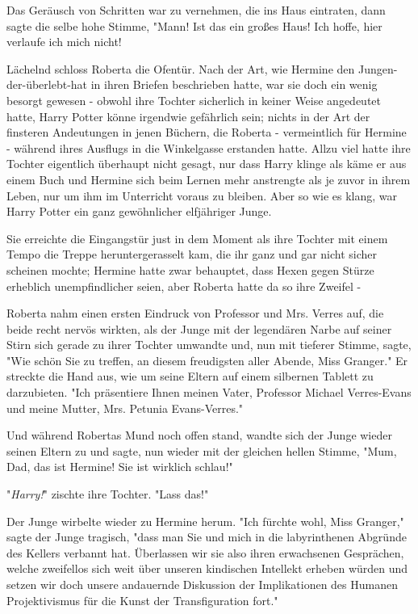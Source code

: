 {Das Geräusch von Schritten war zu vernehmen, die ins Haus eintraten, dann sagte die selbe hohe Stimme, "Mann! Ist das ein großes Haus! Ich hoffe, hier verlaufe ich mich nicht!

Lächelnd schloss Roberta die Ofentür. Nach der Art, wie Hermine den Jungen-der-überlebt-hat in ihren Briefen beschrieben hatte, war sie doch ein wenig besorgt gewesen - obwohl ihre Tochter sicherlich in keiner Weise angedeutet hatte, Harry Potter könne irgendwie gefährlich sein; nichts in der Art der finsteren Andeutungen in jenen Büchern, die Roberta - vermeintlich für Hermine - während ihres Ausflugs in die Winkelgasse erstanden hatte. Allzu viel hatte ihre Tochter eigentlich überhaupt nicht gesagt, nur dass Harry klinge als käme er aus einem Buch und Hermine sich beim Lernen mehr anstrengte als je zuvor in ihrem Leben, nur um ihm im Unterricht voraus zu bleiben. Aber so wie es klang, war Harry Potter ein ganz gewöhnlicher elfjähriger Junge.

Sie erreichte die Eingangstür just in dem Moment als ihre Tochter mit einem Tempo die Treppe heruntergerasselt kam, die ihr ganz und gar nicht sicher scheinen mochte; Hermine hatte zwar behauptet, dass Hexen gegen Stürze erheblich unempfindlicher seien, aber Roberta hatte da so ihre Zweifel -

Roberta nahm einen ersten Eindruck von Professor und Mrs. Verres auf, die beide recht nervös wirkten, als der Junge mit der legendären Narbe auf seiner Stirn sich gerade zu ihrer Tochter umwandte und, nun mit tieferer Stimme, sagte, "Wie schön Sie zu treffen, an diesem freudigsten aller Abende, Miss Granger." Er streckte die Hand aus, wie um seine Eltern auf einem silbernen Tablett zu darzubieten. "Ich präsentiere Ihnen meinen Vater, Professor Michael Verres-Evans und meine Mutter, Mrs. Petunia Evans-Verres."

Und während Robertas Mund noch offen stand, wandte sich der Junge wieder seinen Eltern zu und sagte, nun wieder mit der gleichen hellen Stimme, "Mum, Dad, das ist Hermine! Sie ist wirklich schlau!"

"\emph{Harry!}" zischte ihre Tochter. "Lass das!"

Der Junge wirbelte wieder zu Hermine herum. "Ich fürchte wohl, Miss Granger," sagte der Junge tragisch, "dass man Sie und mich in die labyrinthenen Abgründe des Kellers verbannt hat. Überlassen wir sie also ihren erwachsenen Gesprächen, welche zweifellos sich weit über unseren kindischen Intellekt erheben würden und setzen wir doch unsere andauernde Diskussion der Implikationen des Humanen Projektivismus für die Kunst der Transfiguration fort."

}
